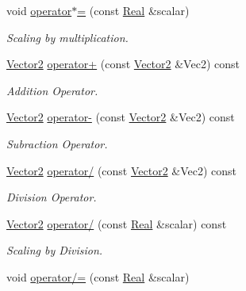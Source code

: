 \begin{DoxyCompactItemize}
void \hyperlink{classMezzanine_1_1Vector2_a47d00c3847a59f726ffa6a0a99a372c8}{operator$\ast$=} (const \hyperlink{namespaceMezzanine_a726731b1a7df72bf3583e4a97282c6f6}{Real} \&scalar)
\begin{DoxyCompactList}\small\item\em Scaling by multiplication. \item\end{DoxyCompactList}\item 
\hyperlink{classMezzanine_1_1Vector2}{Vector2} \hyperlink{classMezzanine_1_1Vector2_a232c79761cfd97aef96999732cda0acc}{operator+} (const \hyperlink{classMezzanine_1_1Vector2}{Vector2} \&Vec2) const 
\begin{DoxyCompactList}\small\item\em Addition Operator. \item\end{DoxyCompactList}\item 
\hyperlink{classMezzanine_1_1Vector2}{Vector2} \hyperlink{classMezzanine_1_1Vector2_a8311974bf9b4f65e2a43f3cb6d2b32b0}{operator-\/} (const \hyperlink{classMezzanine_1_1Vector2}{Vector2} \&Vec2) const 
\begin{DoxyCompactList}\small\item\em Subraction Operator. \item\end{DoxyCompactList}\item 
\hyperlink{classMezzanine_1_1Vector2}{Vector2} \hyperlink{classMezzanine_1_1Vector2_a2c956fc7eafffba4c0f707b240e113a8}{operator/} (const \hyperlink{classMezzanine_1_1Vector2}{Vector2} \&Vec2) const 
\begin{DoxyCompactList}\small\item\em Division Operator. \item\end{DoxyCompactList}\item 
\hyperlink{classMezzanine_1_1Vector2}{Vector2} \hyperlink{classMezzanine_1_1Vector2_a76d2db9e91db1662612ccf122a4b55bd}{operator/} (const \hyperlink{namespaceMezzanine_a726731b1a7df72bf3583e4a97282c6f6}{Real} \&scalar) const 
\begin{DoxyCompactList}\small\item\em Scaling by Division. \item\end{DoxyCompactList}\item 
void \hyperlink{classMezzanine_1_1Vector2_ad42b7cd3efd647cdbf4b299ab2dc39f2}{operator/=} (const \hyperlink{namespaceMezzanine_a726731b1a7df72bf3583e4a97282c6f6}{Real} \&scalar)

\end{DoxyCompactItemize}
